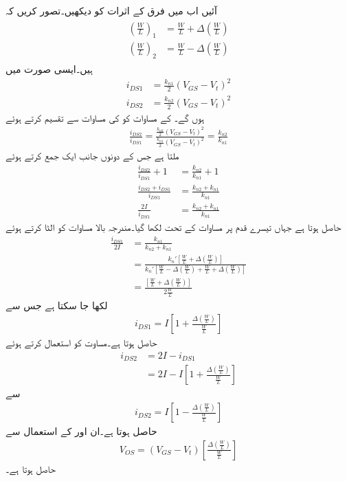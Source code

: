 آئیں اب  میں فرق کے اثرات کو دیکھیں۔تصور کریں کہ
\begin{gather}
\begin{aligned}
\left(\frac{W}{L}\right)_1&=\frac{W}{L}+\Delta \left(\frac{W}{L}\right)\\
\left(\frac{W}{L}\right)_2&=\frac{W}{L}-\Delta \left(\frac{W}{L}\right)
\end{aligned}
\end{gather}
ہیں۔ایسی صورت میں
\begin{align*}
i_{DS1}&=\frac{k_{n1}}{2} \left(V_{GS}-V_t\right)^2\\
i_{DS2}&=\frac{k_{n2}}{2} \left(V_{GS}-V_t\right)^2
\end{align*}
ہوں گے۔ کے مساوات کو  کی مساوات سے تقسیم کرتے ہوئے
\begin{align*}
\frac{i_{DS2}}{i_{DS1}}=\frac{\frac{k_{n2}}{2} \left(V_{GS}-V_t\right)^2}{\frac{k_{n1}}{2} \left(V_{GS}-V_t\right)^2}=\frac{k_{n2}}{k_{n1}}
\end{align*}
ملتا ہے جس کے دونوں جانب ایک جمع کرتے  ہوئے
\begin{align*}
\frac{i_{DS2}}{i_{DS1}}+1&=\frac{k_{n2}}{k_{n1}}+1\\
\frac{i_{DS2}+i_{DS1}}{i_{DS1}}&=\frac{k_{n2}+k_{n1}}{k_{n1}}\\
\frac{2 I}{i_{DS1}}&=\frac{k_{n2}+k_{n1}}{k_{n1}}
\end{align*}
حاصل ہوتا ہے جہاں تیسرے قدم پر مساوات  کے تحت  لکھا گیا۔مندرجہ بالا مساوات کو الٹا کرتے ہوئے
\begin{align*}
\frac{i_{DS1}}{2I}&=\frac{k_{n1}}{k_{n2}+k_{n1}}\\
&=\frac{k_n' \left[\frac{W}{L}+\Delta \left(\frac{W}{L}\right) \right]}{k_n' \left[\frac{W}{L}-\Delta \left(\frac{W}{L}\right)+\frac{W}{L}+\Delta \left(\frac{W}{L}\right) \right]}\\
&=\frac{\left[\frac{W}{L}+\Delta \left(\frac{W}{L}\right) \right]}{2 \frac{W}{L}}
\end{align*}
لکھا جا سکتا ہے جس سے
\begin{align}
i_{DS1}=I \left[1+\frac{\Delta \left(\frac{W}{L} \right)}{\frac{W}{L}}\right]
\end{align}
حاصل ہوتا ہے۔مساوت  کو استعمال کرتے ہوئے
\begin{align*}
i_{DS2}&=2 I -i_{DS1}\\
&=2 I-I \left[1+\frac{\Delta \left(\frac{W}{L} \right)}{\frac{W}{L}}\right]
\end{align*}
سے
\begin{align}\label{مساوات_تفرقی_رقبے_میں_فرق_سے_دوسری_برقی_رو}
i_{DS2}=I \left[1-\frac{\Delta \left(\frac{W}{L} \right)}{\frac{W}{L}}\right]
\end{align}
حاصل ہوتا ہے۔ان  اور  کے استعمال سے
\begin{align}\label{مساوات_تفرقی_رقبے_میں_فرق_سے_داخلی_انحرافی_برقی_دباو}
V_{OS}=\left(V_{GS}-V_t \right)\left[\frac{\Delta \left(\frac{W}{L}\right)}{\frac{W}{L}}\right]
\end{align}
حاصل ہوتا ہے۔

